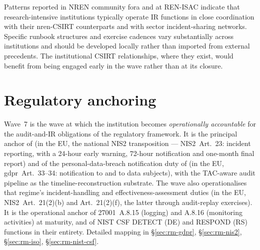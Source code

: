 \begin{realworldbox}
\noindent Patterns reported in NREN community fora and at
REN-ISAC indicate that research-intensive institutions
typically operate IR functions in close coordination with
their \gls{nren}-CSIRT counterparts and with sector incident-sharing
networks. Specific runbook structures and exercise cadences
vary substantially across institutions and should be developed
locally rather than imported from external precedents. The
institutional CSIRT relationships, where they exist, would
benefit from being engaged early in the wave rather than at
its closure.
\end{realworldbox}

\section{Regulatory anchoring}
\label{sec:w7-regulatory}

\noindent Wave~7 is the wave at which the institution becomes
\emph{operationally accountable} for the audit-and-IR
obligations of the regulatory framework. It is the principal
anchor of 
(in the EU, the national NIS2 transposition --- NIS2~Art.~23:
incident reporting, with a 24-hour early warning, 72-hour
notification and one-month final report) and of the
personal-data-breach notification duty of
 (in the EU, \gls{gdpr}~Art.~33--34:
notification to  and to data
subjects), with the
TAC-aware audit pipeline as the timeline-reconstruction
substrate. The wave also operationalises that regime's
incident-handling and effectiveness-assessment duties
(in the EU, NIS2~Art.~21(2)(b) and Art.~21(2)(f), the latter
through audit-replay exercises). It is the
operational anchor of 27001~A.8.15 (logging) and A.8.16
(monitoring activities) at maturity, and of NIST CSF
\textsf{DETECT} (DE) and \textsf{RESPOND} (RS) functions in
their entirety. Detailed mapping in
 \S\ref{sec:rm-gdpr},
\S\ref{sec:rm-nis2}, \S\ref{sec:rm-iso},
\S\ref{sec:rm-nist-csf}.
